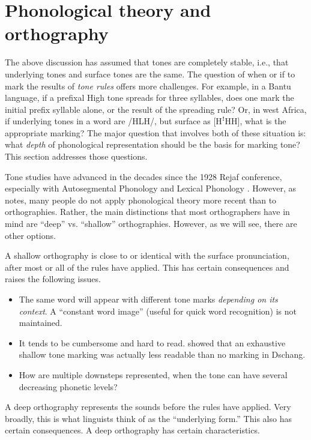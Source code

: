 \documentclass[output=paper]{langscibook}
\begin{document}
\section{Phonological theory and orthography}
\label{sec:PhonTheoryOrtho:4}

The above discussion has assumed that tones are completely stable, i.e., that underlying tones and surface tones are the same. The question of when or if to mark the results of \textit{tone rules} offers more challenges. For example, in a Bantu language, if a prefixal High tone spreads for three syllables, does one mark the initial prefix syllable alone, or the result of the spreading rule? Or, in west Africa, if underlying tones in a word are /HLH/, but surface as [HꜝHH], what is the appropriate marking? The major question that involves both of these situation is: what \textit{depth} of phonological representation should be the basis for marking tone? This section addresses those questions.

Tone studies have advanced in the decades since the 1928 Rejaf conference, especially with Autosegmental Phonology \citep{Goldsmith1976} and Lexical Phonology \citep{Pulleyblank1986}. However, as \citet{Snider2014} notes, many people do not apply phonological theory more recent than \citet{Halle1968} to orthographies. Rather, the main distinctions that most orthographers have in mind are “deep” vs. “shallow” orthographies. However, as we will see, there are other options.

A shallow orthography is close to or identical with the surface pronunciation, after most or all of the rules have applied. This has certain consequences and raises the following issues.

\begin{itemize}
    \item The same word will appear with different tone marks \textit{depending on its context}. A “constant word image” (useful for quick word recognition) is not maintained.
    \item It tends to be cumbersome and hard to read. \citet{Bird1999a} showed that an exhaustive shallow tone marking was actually less readable than no marking in Dschang.
    \item How are multiple downsteps represented, when the tone can have several decreasing phonetic levels?
\end{itemize}


A deep orthography represents the sounds before the rules have applied. Very broadly, this is what linguists think of as the “underlying form.” This also has certain consequences. A deep orthography has certain characteristics.
\end{document}
